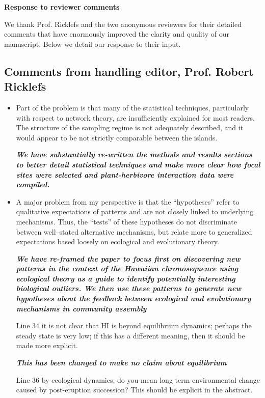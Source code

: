 \documentclass[12pt]{article}
\begin{document}
\begin{center}
{\large \bf Response to reviewer comments}
\end{center}
\vspace{2em}

We thank Prof. Ricklefs and the two anonymous reviewers for their
detailed comments that have enormously improved the clarity and
quality of our manuscript.  Below we detail our response to their input.

\subsection*{Comments from handling editor, Prof. Robert Ricklefs}

\begin{itemize}
\item Part of the problem is that many of the statistical techniques,
  particularly with respect to network theory, are insufficiently
  explained for most readers. The structure of the sampling regime is
  not adequately described, and it would appear to be not strictly
  comparable between the islands.

\textit{\textbf{We have substantially re-written the methods and results
    sections to better detail statistical techniques and make more
    clear how focal sites were selected and plant-herbivore
    interaction data were compiled.}}
\item A major problem from my perspective is that the ``hypotheses''
  refer to qualitative expectations of patterns and are not closely
  linked to underlying mechanisms. Thus, the ``tests'' of these
  hypotheses do not discriminate between well--stated alternative
  mechanisms, but relate more to generalized expectations based
  loosely on ecological and evolutionary theory.  

  \textit{\textbf{We have re-framed the paper to focus first on
      discovering new patterns in the context of the Hawaiian
      chronosequence using ecological theory as a guide to identify
      potentially interesting biological outliers. We then use these
      patterns to generate new hypotheses about the feedback between
      ecological and evolutionary mechanisms in community assembly}}
\item[Line 34] it is not clear that HI is beyond equilibrium dynamics;
  perhaps the steady state is very low; if this has a different
  meaning, then it should be made more explicit.

  \textit{\textbf{This has been changed to make no claim about
      equilibrium}}
%
\item[Line 36] by ecological dynamics, do you mean long term
  environmental change caused by post-eruption succession? This should
  be explicit in the abstract.


\end{itemize}
\end{document}
